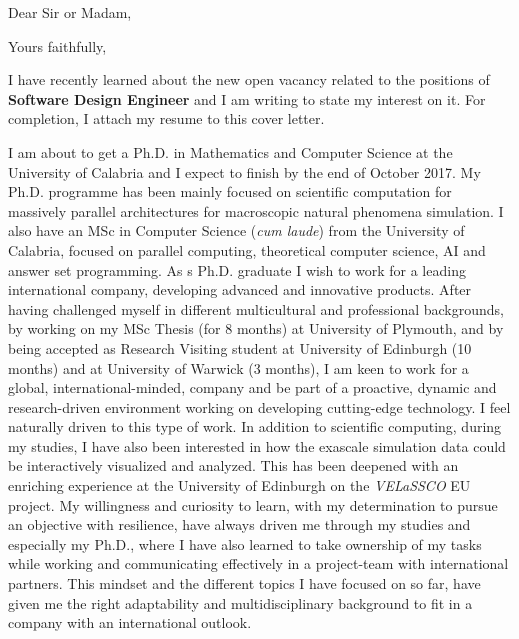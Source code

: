 \documentclass[12pt,a4paper,sans]{moderncv}        %
\begin{document}
\date{\today}
\opening{Dear Sir or Madam,}
\closing{Yours faithfully,}
\makelettertitle
\justify
I have recently learned about the new open vacancy related to the positions of \textbf{Software Design Engineer} and I am writing to state my interest on it. For completion, I attach my resume to this cover letter.

I am about to get a Ph.D. in Mathematics and Computer Science at the University of Calabria and I expect to finish by the end of October 2017. My Ph.D. programme has been mainly focused on scientific computation for massively parallel architectures for macroscopic natural phenomena simulation. I also have an MSc in Computer Science (\textit{cum laude}) from the University of Calabria, focused on parallel computing, theoretical computer science, AI and answer set programming.
As s Ph.D. graduate I wish to work for a leading international company, developing advanced and innovative products. 
After having challenged myself in different multicultural and professional backgrounds, by working on my MSc Thesis (for 8 months) at University of Plymouth, and by being accepted as Research Visiting student at  University of Edinburgh (10 months) and at University of Warwick (3 months), I am keen to work for a global, international-minded, company and be part of a proactive, dynamic and research-driven environment working on developing cutting-edge technology. 
I feel naturally driven to this type of work.
In addition to scientific computing, during my studies, I have also been interested in how the exascale simulation data could be interactively visualized and analyzed. This has been deepened with an enriching experience at the University of Edinburgh on the \textit{VELaSSCO} EU project.
My willingness and curiosity to learn, with my determination to pursue an objective with resilience, have always driven me through my studies and especially my Ph.D., where I have also learned to take ownership of my tasks while working and communicating effectively in a project-team with international partners. This mindset and the different
topics I have focused on so far, have given me the right adaptability and multidisciplinary background to fit in a company with an international outlook.
\end{document}
